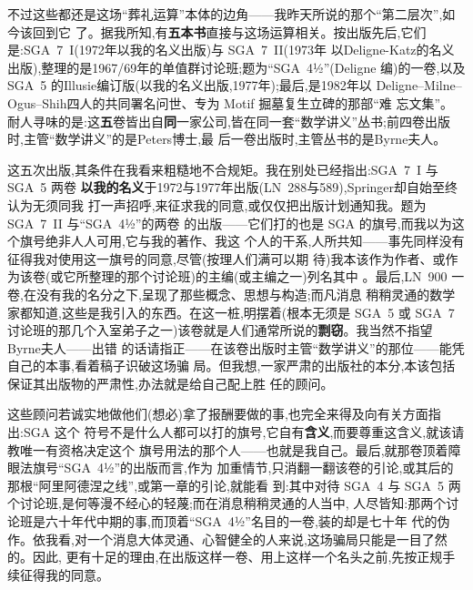 不过这些都还是这场“葬礼运算”本体的边角——我昨天所说的那个“第二层次”,如今该回到它
了。据我所知,有\textbf{五本书}直接与这场运算相关。按出版先后,它们是:SGA~7~I(1972年以我的名义出版)与 SGA~7~II(1973年
以Deligne-Katz的名义出版),整理的是1967/69年的单值群讨论班;题为“SGA~4½”(Deligne
编)的一卷,以及 SGA~5 的Illusie编订版(以我的名义出版,1977年);最后,是1982年以
Deligne--Milne--Ogus--Shih四人的共同署名问世、专为 Motif 掘墓复生立碑的那部“难
忘文集”。耐人寻味的是:这\textbf{五}卷皆出自\textbf{同}一家公司,皆在同一套“数学讲义”丛书;前四卷出版时,主管“数学讲义”的是Peters博士,最
后一卷出版时,主管丛书的是Byrne夫人。

这五次出版,其条件在我看来粗糙地不合规矩。我在别处已经指出:SGA~7~I 与 SGA~5 两卷
\textbf{以我的名义}于1972与1977年出版(LN~288与589),Springer却自始至终认为无须同我
打一声招呼,来征求我的同意,或仅仅把出版计划通知我。题为 SGA~7~II 与“SGA~4½”的两卷
的出版——它们打的也是 SGA 的旗号,而我以为这个旗号绝非人人可用,它与我的著作、我\dmark{}这
个人的干系,人所共知——事先同样没有征得我对使用这一旗号的同意,尽管(按理人们满可以期
待)我本该作为作者、或作为该卷(或它所整理的那个讨论班)的主编(或主编之一)列名其中
。最后,LN~900 一卷,在没有我的名分之下,呈现了那些概念、思想与构造;而凡消息
稍稍灵通的数学家都知道,这些是我引入的东西。在这一桩,明摆着(根本无须是 SGA~5 或 SGA~7
讨论班的那几个入室弟子之一)该卷就是人们通常所说的\textbf{剽窃}。我当然不指望Byrne夫人——出错
的话请指正——在该卷出版时主管“数学讲义”的那位——能凭自己的本事,看着稿子识破这场骗
局。但我想,一家严肃的出版社的本分,本该包括保证其出版物的严肃性,办法就是给自己配上胜
任的顾问。

这些顾问若诚实地做他们(想必)拿了报酬要做的事,也完全来得及向有关方面指出:SGA 这个
符号不是什么人都可以打的旗号,它自有\textbf{含义},而要尊重这含义,就该请教唯一有资格决定这个
旗号用法的那个人——也就是我自己。最后,就那卷顶着障眼法旗号“SGA~4½”的出版而言,作为
加重情节,只消翻一翻该卷的引论,或其后的那根“阿里阿德涅之线”,或第一章的引论,就能看
到:其中对待 SGA~4 与 SGA~5 两个讨论班,是何等漫不经心的轻蔑;而在消息稍稍灵通的人当中,
人尽皆知:那两个讨论班是六十年代中期的事,而顶着“SGA~4½”名目的一卷,装的却是七十年
代的伪作。依我看,对一个消息大体灵通、心智健全的人来说,这场骗局只能是一目了然的。因此,
更有十足的理由,在出版这样一卷、用上这样一个名头之前,先按正规手续征得我的同意。

